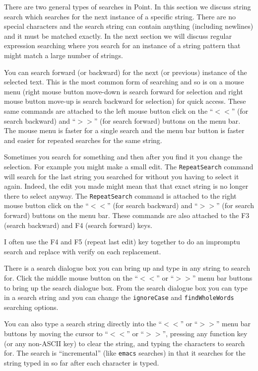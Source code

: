 There are two general types of searches in Point.
In this section we discuss string search which searches for
the next instance of a specific string.
There are no special characters and the search string can contain
anything (including newlines) and it must be matched exactly.
In the next section we will discuss regular expression searching where 
you search for an instance of a string pattern that might match
a large number of strings.

You can search forward (or backward) for the next (or previous)
instance of the selected text.
This is the most common form of searching and so is on a mouse menu
(right mouse button move-down is search forward for selection
and right mouse button move-up is search backward for selection)
for quick access.
These same commands are attached to the left mouse button click
on the ``$<<$'' (for search backward) and ``$>>$'' (for search
forward) buttons on the menu bar.
The mouse menu is faster for a single search and the menu bar
button is faster and easier for repeated searches for the same string.

Sometimes you search for something and then after you find it you
change the selection.
For example you might make a small edit.
The {\tt RepeatSearch} command will search for the last string
you searched for without you having to select it again.
Indeed, the edit you made might mean that that exact string is
no longer there to select anyway.
The {\tt RepeatSearch} command is attached to the right mouse
button click on the ``$<<$'' (for search backward)
and ``$>>$'' (for search forward) buttons on the menu bar.
These commands are also attached to the F3 (search backward)
and F4 (search forward) keys.

I often use the F4 and F5 (repeat last edit) key together to do an
impromptu search and replace with verify on each replacement.

There is a search dialogue box you can bring up and type in any string
to search for.
Click the middle mouse button on the ``$<<$'' or ``$>>$'' menu
bar buttons to bring up the search dialogue box.
From the search dialogue box you can type in a search string
and you can change the {\tt ignoreCase} and {\tt findWholeWords}
searching options.

You can also type a search string directly into the ``$<<$'' or ``$>>$''
menu bar buttons by moving the cursor to ``$<<$'' or ``$>>$'',
pressing any function key (or any non-ASCII key) to
clear the string, and typing the characters to search for.
The search is ``incremental'' (like {\tt emacs} searches) in that it searches
for the string typed in so far after each character is typed.

